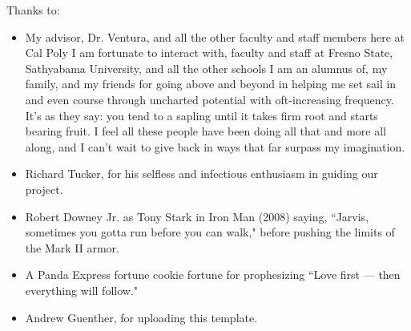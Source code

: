 \noindent
Thanks to:
\begin{itemize}
    \item My advisor, Dr. Ventura, and all the other faculty and staff members here at Cal Poly I am fortunate to interact with, faculty and staff at Fresno State, Sathyabama University, and all the other schools I am an alumnus of, my family, and my friends for going above and beyond in helping me set sail in and even course through uncharted potential with oft-increasing frequency. It's as they say: you tend to a sapling until it takes firm root and starts bearing fruit. I feel all these people have been doing all that and more all along, and I can't wait to give back in ways that far surpass my imagination.
    \item Richard Tucker, for his selfless and infectious enthusiasm in guiding our project.
    \item Robert Downey Jr. as Tony Stark in Iron Man (2008) saying, ``Jarvis, sometimes you gotta run before you can walk," before pushing the limits of the Mark II armor.
    \item A Panda Express fortune cookie fortune for prophesizing ``Love first --- then everything will follow."
    \item Andrew Guenther, for uploading this template.
\end{itemize}
